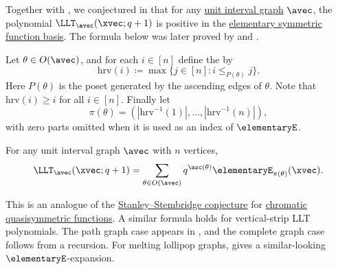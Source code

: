 Together with , we conjectured in
\cite{AlexanderssonPanova2018} that for any
\hyperref[unitIntervalGraph]{unit interval graph} $\avec$, the polynomial
$\LLT_\avec(\xvec;q+1)$ is positive in the
\hyperref[elementaryE]{elementary symmetric function basis}.  The formula
below was later proved by  and
.

Let $\theta\in O(\avec)$, and for each $i\in[n]$ define the
\label{highestReachableVertex} by
\[
\mathrm{hrv}(i)\coloneqq \max\{j\in[n]: i\leq_{P(\theta)}j\}.
\]
Here $P(\theta)$ is the poset generated by the ascending edges of
$\theta$.  Note that $\mathrm{hrv}(i)\geq i$ for all $i\in[n]$.  Finally let
\[
\pi(\theta)=(|\mathrm{hrv}^{-1}(1)|,\dotsc,|\mathrm{hrv}^{-1}(n)|),
\]
with zero parts omitted when it is used as an index of $\elementaryE$.

\begin{theorem}
For any unit interval graph $\avec$ with $n$ vertices,
\[
\LLT_\avec(\xvec;q+1)
=
\sum_{\theta\in O(\avec)}q^{\asc(\theta)}
\elementaryE_{\pi(\theta)}(\xvec).
\]
\end{theorem}

This is an analogue of the
\hyperref[chromaticQuasisymmetricElementaryExpansion]{Stanley--Stembridge
conjecture} for \hyperref[chromaticQuasisymmetricDefinition]{chromatic
quasisymmetric functions}.  A similar formula holds for vertical-strip LLT
polynomials.  The path graph case appears in
\cite{AlexanderssonPanova2018}, and the complete graph case follows from a
recursion.  For melting lollipop graphs, \cite{Alexandersson2019llt} gives a
similar-looking $\elementaryE$-expansion.

